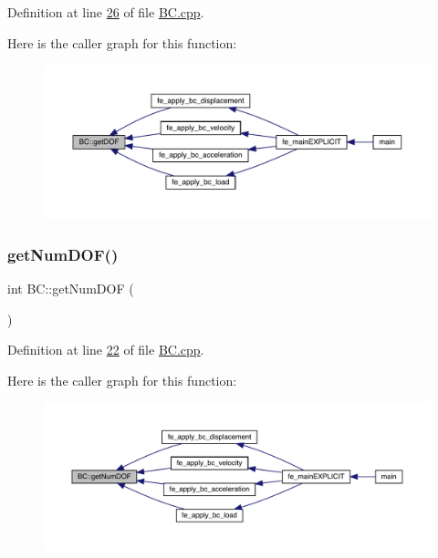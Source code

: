 Definition at line \hyperlink{_b_c_8cpp_source_l00026}{26} of file \hyperlink{_b_c_8cpp_source}{B\+C.\+cpp}.

Here is the caller graph for this function\+:\nopagebreak
\begin{figure}[H]
\begin{center}
\leavevmode
\includegraphics[width=350pt]{class_b_c_a0bc8eb90956a082ada5e4daa5e32c9fc_icgraph}
\end{center}
\end{figure}
\mbox{\label{class_b_c_a6e42c3db5c67435bf2616768959866e9}} 
\subsubsection{\texorpdfstring{get\+Num\+D\+O\+F()}{getNumDOF()}}
{\footnotesize\ttfamily int B\+C\+::get\+Num\+D\+OF (\begin{DoxyParamCaption}{ }\end{DoxyParamCaption})}



Definition at line \hyperlink{_b_c_8cpp_source_l00022}{22} of file \hyperlink{_b_c_8cpp_source}{B\+C.\+cpp}.

Here is the caller graph for this function\+:\nopagebreak
\begin{figure}[H]
\begin{center}
\leavevmode
\includegraphics[width=350pt]{class_b_c_a6e42c3db5c67435bf2616768959866e9_icgraph}
\end{center}
\end{figure}
\mbox{\label{class_b_c_a3590d0a29a9261d99f21ee75340e5722}} 
